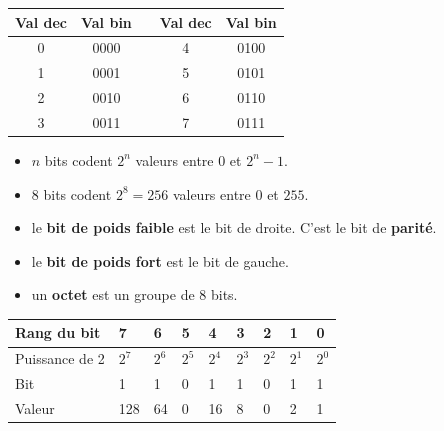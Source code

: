 \def\level{Première}  %
\def\course{NSI}
\def\chaptername{Représentation des entiers positifs} %
\def\docname{RD01-S}        %

\pagestyle{cours_FP}
\makeheader{} %

\begin{propriete}{}

	\begin{minipage}{0.38\linewidth}
		\begin{tabular}{|c|c|c|c|c|}
	\hline
	Val dec & Val bin & & Val dec & Val bin\\ \hline
	0 & 0000 & & 4 & 0100 \\ \hline
	1 & 0001 & & 5 & 0101 \\ \hline
	2 & 0010 & & 6 & 0110 \\ \hline
	3 & 0011 & & 7 & 0111 \\ \hline
\end{tabular}
	\end{minipage}\hfill
	\begin{minipage}{0.58\linewidth}
		\begin{itemize}
		\item $n$ bits codent $2^n$ valeurs entre 0 et $2^n-1$.
		\item $8$ bits codent $2^8 = 256$ valeurs entre 0 et $255$.
		\item le \textbf{bit de poids faible} est le bit de droite. C'est le bit de \textbf{parité}. 
		\item le \textbf{bit de poids fort} est le bit de gauche.
		\item un \textbf{octet} est un groupe de 8 bits.
	\end{itemize}

	\end{minipage}
\end{propriete}

\begin{methode}[Conversion binaire~--~décimal: $1101\,1011_2=128+64+16+8+2+1=219_{10}$]{}

\renewcommand{\arraystretch}{1.4}
		\begin{tabular}{|p{2.6cm}|p{1.3cm}|p{1.3cm}|p{1.3cm}|p{1.3cm}|p{1.3cm}|p{1.3cm}|p{1.3cm}|p{1.3cm}|}
		\hline
		Rang du bit & 7 & 6 & 5 & 4 & 3 & 2 & 1 & 0 \\ \hline
		Puissance de 2 & $2^7$ & $2^6$ & $2^5$ & $2^4$ & $2^3$ & $2^2$ & $2^1$ & $2^0$ \\ \hline
		Bit & 1 & 1 & 0 & 1 & 1 & 0 & 1 & 1 \\ \hline
		Valeur & 128 & 64 & 0 & 16 & 8 & 0 & 2 & 1 \\ \hline
		
		\end{tabular}
		\end{methode}

